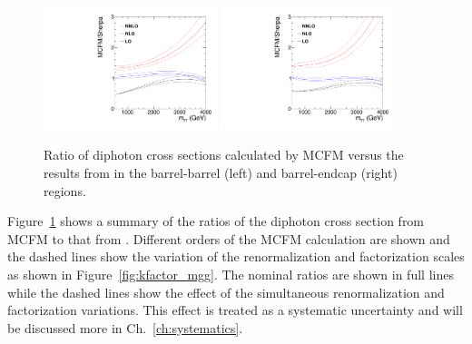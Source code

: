 \begin{figure}[htbp!]
\caption{Ratio of diphoton cross sections calculated by MCFM versus the results from \SHERPA in the barrel-barrel (left) and barrel-endcap (right) regions.}
\begin{center}
\includegraphics[angle=0,width=0.45\textwidth]{fig/kfactor_comparison_BB_125GeV_NNPDF.pdf}
\includegraphics[angle=0,width=0.45\textwidth]{fig/kfactor_comparison_BE_125GeV_NNPDF.pdf}
\end{center}
\label{fig:kfactor_comparison}
\end{figure}

Figure~\ref{fig:kfactor_comparison} shows a summary of the ratios of the diphoton cross section from MCFM to that from \SHERPA. Different orders of the MCFM calculation are shown and the dashed lines show the variation of the renormalization and factorization scales as shown in Figure~\ref{fig:kfactor_mgg}. The nominal ratios are shown in full lines while the dashed lines show the effect of the simultaneous renormalization and factorization variations. This effect is treated as a systematic uncertainty and will be discussed more in Ch.~\ref{ch:systematics}. 

